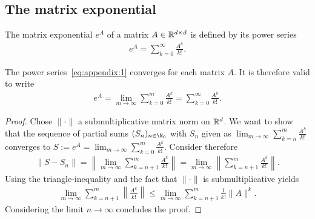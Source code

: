 \subsection{The matrix exponential}
\label{sec:matrix-exponentials}

\begin{definition}
  The matrix exponential $e^A$ of a matrix $A\in \mathbb R^{d\times d}$ is defined
  by its power series
  \begin{gather}
    \label{eq:appendix:1}
    e^A = \sum_{k=0}^\infty \frac{A^k}{k!}.
  \end{gather}
\end{definition}

\begin{lemma}
  \label{lemma:appendix:exp-0}
  The power series~\eqref{eq:appendix:1} converges for each matrix $A$. It is
  therefore valid to write
  \begin{gather}
    \label{eq:appendix:1.5}
    e^A = \lim_{m \to \infty} \sum_{k=0}^m \frac{A^k}{k!}
		= \sum_{k=0}^\infty \frac{A^k}{k!}.
  \end{gather}
\end{lemma}

\begin{proof}
  Chose $\| \cdot \|$ a submultiplicative matrix norm on $\mathbb R^d$. We want to
  show that the sequence of partial sums $(S_n)_{n \in \N_0}$ with $S_n$
  given as $\lim_{m \to \infty} \sum_{k=n} ^m \frac{A^k}{k!}$ converges to
  $S := e^A = \lim_{m \to \infty} \sum_{k=0} ^m \frac{A^k}{k!}$. Consider
  therefore
  \begin{gather}
    \|S - S_n\| = \left\| \lim_{m \to \infty} \sum_{k=n+1}^m \frac{A^k}{k!} \right\|
		= \lim_{m \to \infty} \left\| \sum_{k=n+1}^m \frac{A^k}{k!} \right\|.
  \end{gather}
  Using the triangle-inequality and the fact that $\| \cdot \|$ is submultiplicative
  yields
  \begin{gather}
  	\lim_{m \to \infty} \sum_{k=n+1}^m \left\| \frac{A^k}{k!} \right\|
		\le \lim_{m \to \infty} \sum_{k=n+1}^m \frac{1}{k!} \|A \|^k.
  \end{gather}
  Considering the limit $n \to \infty$ concludes the proof.
\end{proof}

